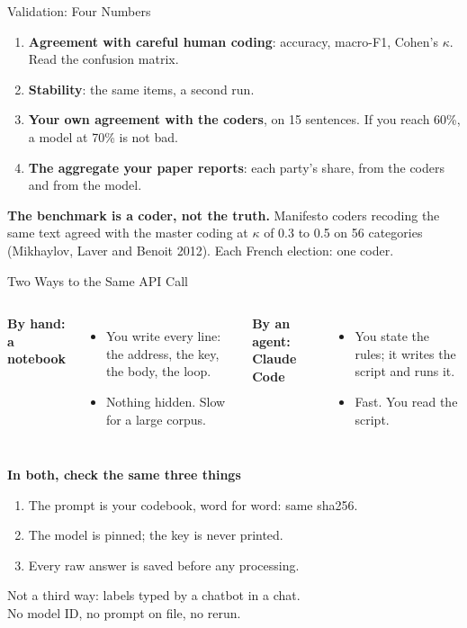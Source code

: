 \documentclass[svgnames,x11names,dvipsnames]{beamer}
\newcommand{\chg}[1]{{\bfseries #1}}
\renewcommand{\chg}[1]{#1}
\begin{document}
\begin{frame}{Validation: Four Numbers}
\small
\begin{enumerate}
    \setlength{\itemsep}{7pt}
    \item \textbf{Agreement with careful human coding}: accuracy, macro-F1, Cohen's $\kappa$. Read the confusion matrix.
    \item \textbf{Stability}: the same items, a second run.
    \item \textbf{Your own agreement with the coders}, on 15 sentences. If you reach 60\%, a model at 70\% is not bad.
    \item \textbf{The aggregate your paper reports}: each party's share, from the coders and from the model.
\end{enumerate}

\vspace{0.5cm}
{\footnotesize \textbf{The benchmark is a coder, not the truth.} Manifesto coders recoding the same text agreed with the master coding at $\kappa$ of 0.3 to 0.5 on 56 categories (Mikhaylov, Laver and Benoit 2012). Each French election: one coder.}
\end{frame}

\begin{frame}{\chg{Two Ways to the Same API Call}}
\small
\begin{columns}[T]
\textbf{By hand: a notebook}
\begin{itemize}
    \setlength{\itemsep}{3pt}
    \item You write every line: the address, the key, the body, the loop.
    \item Nothing hidden. Slow for a large corpus.
\end{itemize}
\textbf{By an agent: Claude Code}
\begin{itemize}
    \setlength{\itemsep}{3pt}
    \item You state the rules; it writes the script and runs it.
    \item Fast. You read the script.
\end{itemize}
\end{columns}

\vspace{0.4cm}
\textbf{In both, check the same three things}
\begin{enumerate}
    \setlength{\itemsep}{2pt}
    \item The prompt is your codebook, word for word: same sha256.
    \item The model is pinned; the key is never printed.
    \item Every raw answer is saved before any processing.
\end{enumerate}

\vspace{0.3cm}
\centering
\alert{Not a third way: labels typed by a chatbot in a chat.}\\
{\footnotesize No model ID, no prompt on file, no rerun.}
\end{frame}
\end{document}
